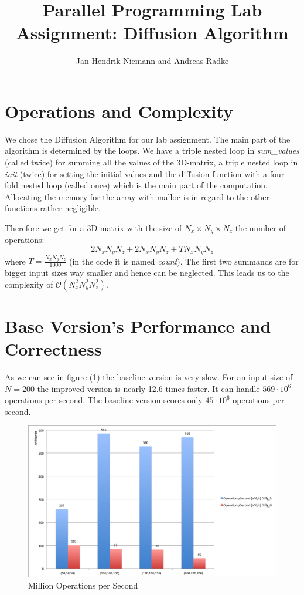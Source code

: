 \documentclass[12pt,a4paper]{article}
\author{Jan-Hendrik Niemann and Andreas Radke}
\title{Parallel Programming Lab Assignment: Diffusion Algorithm}
\begin{document}
	\maketitle
	
\section{Operations and Complexity}\label{chp:opcom}

We chose the Diffusion Algorithm for our lab assignment.
The main part of the algorithm is determined by the loops. We have a triple nested loop in \emph{sum\_values} (called twice) for summing all the values of the 3D-matrix, a triple nested loop in \emph{init} (twice) for setting the initial values and the diffusion function with a four-fold nested loop (called once) which is the main part of the computation. Allocating the memory for the array with malloc is in regard to the other functions rather negligible. 

Therefore we get for a 3D-matrix with the size of $ N_x\times N_y \times N_z $ the number of operations: \[ 2 N_x N_y N_z + 2 N_x N_y N_z + T N_x N_y N_z \]
where $ T =  \frac{N_x N_y N_z}{1000}$ (in the code it is named \emph{count}).
The first two summands are for bigger input sizes way smaller and hence can be neglected. This leads us to the complexity of $ \mathcal{O}(N_x^2 N_y^2 N_z^2) $.

\section{Base Version's Performance and Correctness}

As we can see in figure (\ref{fig:oper}) the baseline version is very slow. For an input size of $N=200$ the improved version is nearly 12.6 times faster. It can handle $569\cdot10^6$ operations per second. The baseline version scores only $45\cdot10^6$ operations per second.

\begin{figure}[h]
	\centering
	\includegraphics[width=1.0\linewidth]{"Benchmark 2/oper"}
	\caption{Million Operations per Second}
	\label{fig:oper}
\end{figure}
\end{document}
